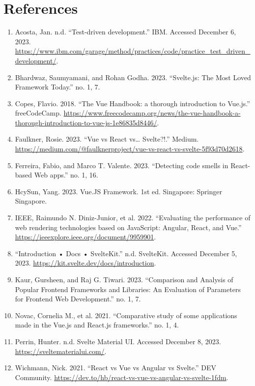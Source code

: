 \section{References}

\begin{enumerate}
    \item Acosta, Jan. n.d. “Test-driven development.” IBM. Accessed December 6, 2023. \url{https://www.ibm.com/garage/method/practices/code/practice_test_driven_development/}.
    \item Bhardwaz, Saumyamani, and Rohan Godha. 2023. “Svelte.js: The Most Loved Framework Today.” no. 1, 7.
    \item Copes, Flavio. 2018. “The Vue Handbook: a thorough introduction to Vue.js.” freeCodeCamp. \url{https://www.freecodecamp.org/news/the-vue-handbook-a-thorough-introduction-to-vue-js-1e86835d8446/}.
    \item Faulkner, Rosie. 2023. “Vue vs React vs… Svelte?!.” Medium. \url{https://medium.com/@faulknerproject/vue-vs-react-vs-svelte-5f93d70d2618}.
    \item Ferreira, Fabio, and Marco T. Valente. 2023. “Detecting code smells in React-based Web apps.” no. 1, 16.
    \item HcySun, Yang. 2023. Vue.JS Framework. 1st ed. Singapore: Springer Singapore.
    \item IEEE, Raimundo N. Diniz-Junior, et al. 2022. “Evaluating the performance of web rendering technologies based on JavaScript: Angular, React, and Vue.” \url{https://ieeexplore.ieee.org/document/9959901}.
    \item “Introduction • Docs • SvelteKit.” n.d. SvelteKit. Accessed December 5, 2023. \url{https://kit.svelte.dev/docs/introduction}.
    \item Kaur, Gursheen, and Raj G. Tiwari. 2023. “Comparison and Analysis of Popular Frontend Frameworks and Libraries: An Evaluation of Parameters for Frontend Web Development.” no. 1, 7.
    \item Novac, Cornelia M., et al. 2021. “Comparative study of some applications made in the Vue.js and React.js frameworks.” no. 1, 4.
    \item Perrin, Hunter. n.d. Svelte Material UI. Accessed December 8, 2023. \url{https://sveltematerialui.com/}.
    \item Wichmann, Nick. 2021. “React vs Vue vs Angular vs Svelte.” DEV Community. \url{https://dev.to/hb/react-vs-vue-vs-angular-vs-svelte-1fdm}.
\end{enumerate}

